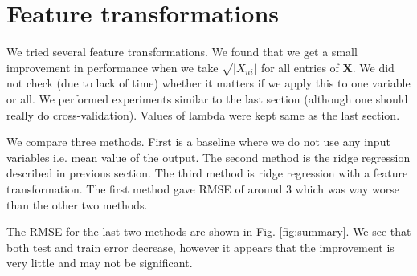 \documentclass{article} %
\begin{document}
\section{Feature transformations}
We tried several feature transformations. We found that we get a small improvement in performance when we take $\sqrt{|X_{ni}|}$ for all entries of $\mathbf{X}$. We did not check (due to lack of time) whether it matters if we apply this to one variable or all. We performed experiments similar to the last section (although one should really do cross-validation). Values of lambda were kept same as the last section. 

We compare three methods. First is a baseline where we do not use any input variables i.e. mean value of the output. The second method is the ridge regression described in previous section. The third method is ridge regression with a feature transformation. The first method gave RMSE of around 3 which was way worse than the other two methods.

The RMSE for the last two methods are shown in Fig. \ref{fig:summary}. We see that both test and train error decrease, however it appears that the improvement is very little and may not be significant.
\end{document}
